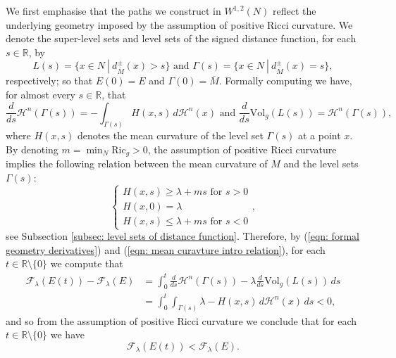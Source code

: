 \documentclass[11pt]{article}
\begin{document}
We first emphasise that the paths we construct in $W^{1,2}(N)$ reflect the underlying geometry imposed by the 
assumption of positive Ricci curvature. We denote the super-level sets and level sets of the signed distance function, for each $s \in \mathbb{R}$, by
\begin{equation*}
L(s) = \{ x \in N \: | \: d^\pm_{\overline{M}}(x) > s \} \text{ and } \Gamma(s) = \{ x \in N \: | \: d^\pm_{\overline{M}}(x) = s \},
\end{equation*}
respectively; so that $E(0) = E$ and $\Gamma(0) = \overline{M}$. Formally computing we have, for almost every $s \in \mathbb{R}$, that 
\begin{equation}\label{eqn: formal geometry derivatives}
    \frac{d}{ds}\mathcal{H}^n(\Gamma(s)) = - \int_{\Gamma(s)} H(x,s) \, d\mathcal{H}^n(x) \text{ and } \frac{d}{ds}\mathrm{Vol}_g(L(s)) = \mathcal{H}^n(\Gamma(s)),
\end{equation}
where $H(x,s)$ denotes the mean curvature of the level set $\Gamma(s)$ at a point $x$. By denoting $m = \min_N \mathrm{Ric}_g > 0$, the assumption of positive Ricci curvature implies the following relation between the mean curvature of $M$ and the level sets $\Gamma(s)$:
\begin{equation}\label{eqn: mean curavture intro relation}
    \begin{cases}
    H(x,s) \geq \lambda + ms \text{ for } s > 0\\
    H(x,0) = \lambda\\
    H(x,s) \leq \lambda + ms \text{ for } s < 0
    \end{cases},
\end{equation}
see Subsection \ref{subsec: level sets of distance function}. Therefore, by (\ref{eqn: formal geometry derivatives}) and (\ref{eqn: mean curavture intro relation}), for each $t \in \mathbb{R} \setminus \{0\}$ we compute that
\begin{align*}
    \mathcal{F}_\lambda(E(t)) - \mathcal{F}_\lambda(E) &= \int_0^t \frac{d}{ds}\mathcal{H}^n(\Gamma(s)) - \lambda \frac{d}{ds}\mathrm{Vol}_g(L(s)) \, ds\\
    &= \int_0^t \int_{\Gamma(s)} \lambda - H(x,s) \, d\mathcal{H}^n(x) \, ds < 0,
\end{align*}
and so from the assumption of positive Ricci curvature we conclude that for each $t \in \mathbb{R} \setminus \{0\}$ we have
\begin{equation}\label{eqn: geometry term}
    \mathcal{F}_\lambda(E(t)) < \mathcal{F}_\lambda(E).
\end{equation}
\end{document}
